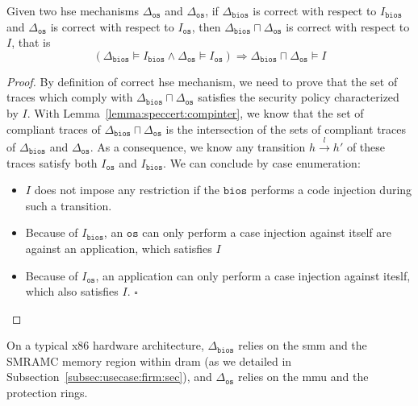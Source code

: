 \begin{theorem}
  Given two \ac{hse} mechanisms \( \Delta_{\mathtt{os}} \) and
  \( \Delta_{\mathtt{os}} \), if \( \Delta_{\mathtt{bios}} \) is correct with
  respect to \( I_{\mathtt{bios}} \) and \( \Delta_{\mathtt{os}} \) is correct
  with respect to \( I_{\mathtt{os}} \), then
  \( \Delta_{\mathtt{bios}} \sqcap \Delta_{\mathtt{os}} \) is correct with
  respect to \( I \), that is
  \[
    (\Delta_{\mathtt{bios}} \models I_{\mathtt{bios}} \wedge
    \Delta_{\mathtt{os}} \models I_{\mathtt{os}}) \Rightarrow
    \Delta_{\mathtt{bios}} \sqcap \Delta_{\mathtt{os}} \models I
  \]

  \begin{proof}
    By definition of correct \ac{hse} mechanism, we need to prove that the set
    of traces which comply with
    \( \Delta_{\mathtt{bios}} \sqcap \Delta_{\mathtt{os}} \) satisfies the
    security policy characterized by \( I \).
    With Lemma~\ref{lemma:speccert:compinter}, we know that the set of compliant
    traces of \( \Delta_{\mathtt{bios}} \sqcap \Delta_{\mathtt{os}} \) is the
    intersection of the sets of compliant traces of \( \Delta_{\mathtt{bios}} \)
    and \( \Delta_{\mathtt{os}} \).
    As a consequence, we know any transition \( h \xrightarrow{l} h' \) of these
    traces satisfy both \( I_{\mathtt{os}} \) and \( I_{\mathtt{bios}} \).
    We can conclude by case enumeration:
    \begin{itemize}
    \item \( I \) does not impose any restriction if the \( \mathtt{bios} \)
      performs a code injection during such a transition.
    \item Because of \( I_{\mathtt{bios}} \), an \( \mathtt{os} \) can only
      perform a case injection against itself are against an application, which
      satisfies \( I \)
    \item Because of \( I_{\mathtt{os}} \), an application can only perform a
      case injection against iteslf, which also satisfies \( I \). \hfill
      \( \square \)
    \end{itemize}
  \end{proof}
\end{theorem}

On a typical x86 hardware architecture, \( \Delta_{\mathtt{bios}} \) relies on
the \ac{smm} and the SMRAMC memory region within \ac{dram} (as we detailed in
Subsection~\ref{subsec:usecase:firm:sec}), and \( \Delta_{\mathtt{os}} \) relies
on the \ac{mmu} and the protection rings.

